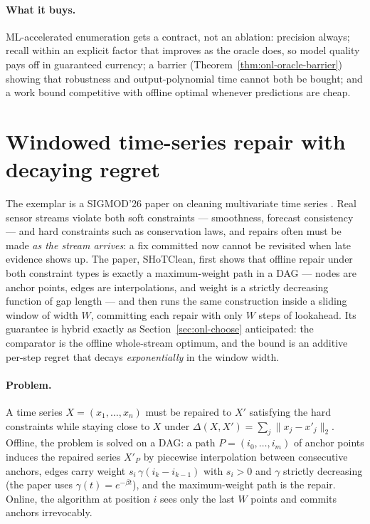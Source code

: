 \paragraph{What it buys.}
ML-accelerated enumeration gets a contract, not an ablation: precision always;
recall within an explicit factor that improves as the oracle does, so model
quality pays off in guaranteed currency; a barrier
(Theorem~\ref{thm:onl-oracle-barrier}) showing that robustness and
output-polynomial time cannot both be bought; and a work bound competitive
with offline optimal whenever predictions are cheap.

\section{Windowed time-series repair with decaying regret}
\label{sec:onl-shclean}

The exemplar is a SIGMOD'26 paper on cleaning multivariate time series
\citep{sigmod26-221}. Real sensor streams violate both soft constraints ---
smoothness, forecast consistency --- and hard constraints such as conservation
laws, and repairs often must be made \emph{as the stream arrives}: a fix
committed now cannot be revisited when late evidence shows up. The paper,
SHoTClean, first shows that offline repair under both constraint types is
exactly a maximum-weight path in a DAG --- nodes are anchor points, edges are
interpolations, and weight is a strictly decreasing function of gap length ---
and then runs the same construction inside a sliding window of width $W$,
committing each repair with only $W$ steps of lookahead. Its guarantee is
hybrid exactly as Section~\ref{sec:onl-choose} anticipated: the comparator is
the offline whole-stream optimum, and the bound is an additive per-step regret
that decays \emph{exponentially} in the window width.

\paragraph{Problem.}
A time series $X = (x_1,\dots,x_n)$ must be repaired to $X'$ satisfying the
hard constraints while staying close to $X$ under
$\Delta(X,X') = \sum_j \lVert x_j - x'_j\rVert_2$. Offline, the problem is
solved on a DAG: a path $P = (i_0,\dots,i_m)$ of anchor points induces the
repaired series $X'_P$ by piecewise interpolation between consecutive anchors,
edges carry weight $s_{i}\,\gamma(i_k - i_{k-1})$ with $s_i > 0$ and $\gamma$
strictly decreasing (the paper uses $\gamma(t) = e^{-\beta t}$), and the
maximum-weight path is the repair. Online, the algorithm at position $i$ sees
only the last $W$ points and commits anchors irrevocably.

